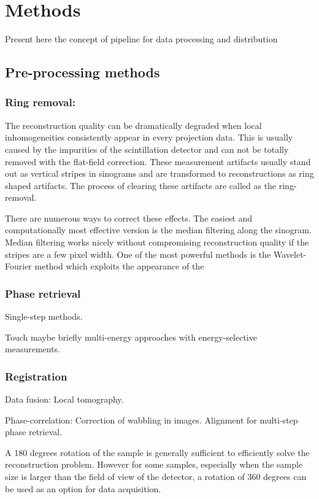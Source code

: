 \documentclass[pdf]{iucr}              %
\begin{document}
\section{Methods} 

Present here the concept of pipeline for data processing and distribution

\subsection{Pre-processing methods}

\subsubsection{Ring removal:}

The reconstruction quality can be dramatically degraded when local inhomogeneities consistently appear in every projection data.  This is usually caused by the impurities of the scintillation detector and can not be totally removed with the flat-field correction. These measurement artifacts usually stand out as vertical stripes in sinograms and are transformed to reconstructions as ring shaped artifacts. The process of clearing these artifacts are called as the ring-removal. 

There are numerous ways to correct these effects. The easiest and computationally most effective version is the median filtering along the sinogram. Median filtering works nicely without compromising reconstruction quality if the stripes are a few pixel width. One of the most powerful methods is the Wavelet-Fourier method which exploits the appearance of the 

\subsubsection{Phase retrieval}

Single-step methods. 

Touch maybe briefly multi-energy approaches with energy-selective measurements.


\subsubsection{Registration}

Data fusion: Local tomography. 

Phase-correlation: Correction of wabbling in images. Alignment for multi-step phase retrieval.

A 180 degrees rotation of the sample is generally sufficient to efficiently solve the reconstruction problem. However for some samples, especially when the sample size is larger than the field of view of the detector, a  rotation of 360 degrees can be used as an option for data acquisition. 
\end{document}

